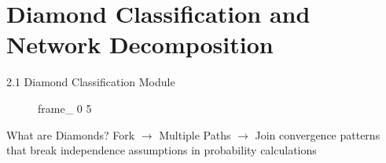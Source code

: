 \documentclass[aspectratio=169]{beamer}
\begin{document}
\section{Diamond Classification and Network Decomposition}

\begin{frame}{\textcolor{juliared}{2.1 Diamond Classification Module}}
\centering
\begin{figure}
    \centering
    {frame_}%
    {0}%
    {5}%
\end{figure}

\begin{block}{\textcolor{juliablue}{What are Diamonds?}}
\small
Fork $\rightarrow$ Multiple Paths $\rightarrow$ Join convergence patterns that break independence assumptions in probability calculations
\end{block}
\end{frame}
\end{document}
